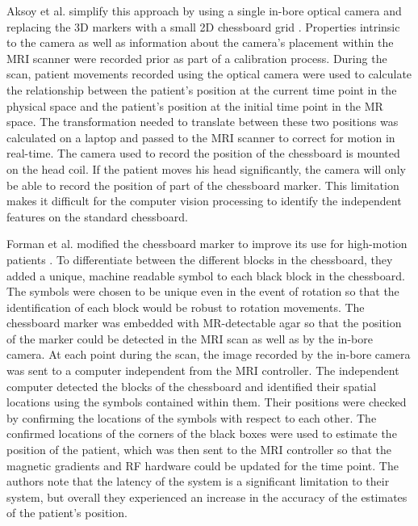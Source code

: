Aksoy et al. simplify this approach by using a single in-bore optical camera and replacing the 3D markers with a small 2D chessboard grid \cite{Aksoy2008}. Properties intrinsic to the camera as well as information about the camera's placement within the MRI scanner were recorded prior as part of a calibration process. During the scan, patient movements recorded using the optical camera were used to calculate the relationship between the patient's position at the current time point in the physical space and the patient's position at the initial time point in the MR space. The transformation needed to translate between these two positions was calculated on a laptop and passed to the MRI scanner to correct for motion in real-time. The camera used to record the position of the chessboard is mounted on the head coil. If the patient moves his head significantly, the camera will only be able to record the position of part of the chessboard marker. This limitation makes it difficult for the computer vision processing to identify the independent features on the standard chessboard. 

Forman et al. modified the chessboard marker to improve its use for high-motion patients \cite{Forman2011}. To differentiate between the different blocks in the chessboard, they added a unique, machine readable symbol to each black block in the chessboard. The symbols were chosen to be unique even in the event of rotation so that the identification of each block would be robust to rotation movements. The chessboard marker was embedded with MR-detectable agar so that the position of the marker could be detected in the MRI scan as well as by the in-bore camera. At each point during the scan, the image recorded by the in-bore camera was sent to a computer independent from the MRI controller. The independent computer detected the blocks of the chessboard and identified their spatial locations using the symbols contained within them. Their positions were checked by confirming the locations of the symbols with respect to each other. The confirmed locations of the corners of the black boxes were used to estimate the position of the patient, which was then sent to the MRI controller so that the magnetic gradients and RF hardware could be updated for the time point. The authors note that the latency of the system is a significant limitation to their system, but overall they experienced an increase in the accuracy of the estimates of the patient's position.

